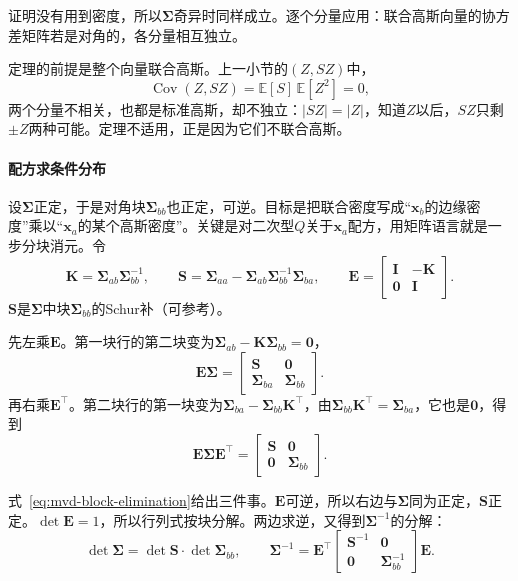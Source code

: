证明没有用到密度，所以$\bm{\Sigma}$奇异时同样成立。逐个分量应用：联合高斯向量的协方差矩阵若是对角的，各分量相互独立。

定理的前提是整个向量联合高斯。上一小节的$(Z,SZ)$中，
\[
 \operatorname{Cov}(Z,SZ)=\mathbb{E}[S]\,\mathbb{E}[Z^{2}]=0 ,
\]
两个分量不相关，也都是标准高斯，却不独立：$\lvert SZ\rvert=\lvert Z\rvert$，知道$Z$以后，$SZ$只剩$\pm Z$两种可能。定理不适用，正是因为它们不联合高斯。

\paragraph{配方求条件分布}
设$\bm{\Sigma}$正定，于是对角块$\bm{\Sigma}_{bb}$也正定，可逆。目标是把联合密度写成“$\bm{x}_b$的边缘密度”乘以“$\bm{x}_a$的某个高斯密度”。关键是对二次型$Q$关于$\bm{x}_a$配方，用矩阵语言就是一步分块消元。令
\[
 \bm{K}=\bm{\Sigma}_{ab}\bm{\Sigma}_{bb}^{-1},\qquad
 \bm{S}=\bm{\Sigma}_{aa}-\bm{\Sigma}_{ab}\bm{\Sigma}_{bb}^{-1}\bm{\Sigma}_{ba},\qquad
 \bm{E}=\begin{bmatrix}\bm{I}&-\bm{K}\\\bm{0}&\bm{I}\end{bmatrix} .
\]
$\bm{S}$是$\bm{\Sigma}$中块$\bm{\Sigma}_{bb}$的Schur补（可参考）。

先左乘$\bm{E}$。第一块行的第二块变为$\bm{\Sigma}_{ab}-\bm{K}\bm{\Sigma}_{bb}=\bm{0}$，
\[
 \bm{E}\bm{\Sigma}=\begin{bmatrix}\bm{S}&\bm{0}\\\bm{\Sigma}_{ba}&\bm{\Sigma}_{bb}\end{bmatrix} .
\]
再右乘$\bm{E}^{\top}$。第二块行的第一块变为$\bm{\Sigma}_{ba}-\bm{\Sigma}_{bb}\bm{K}^{\top}$，由$\bm{\Sigma}_{bb}\bm{K}^{\top}=\bm{\Sigma}_{ba}$，它也是$\bm{0}$，得到
\begin{equation}
 \bm{E}\bm{\Sigma}\bm{E}^{\top}=\begin{bmatrix}\bm{S}&\bm{0}\\\bm{0}&\bm{\Sigma}_{bb}\end{bmatrix} .
 \label{eq:mvd-block-elimination}
\end{equation}

式~\eqref{eq:mvd-block-elimination}给出三件事。$\bm{E}$可逆，所以右边与$\bm{\Sigma}$同为正定，$\bm{S}$正定。$\det\bm{E}=1$，所以行列式按块分解。两边求逆，又得到$\bm{\Sigma}^{-1}$的分解：
\[
 \det\bm{\Sigma}=\det\bm{S}\cdot\det\bm{\Sigma}_{bb},\qquad
 \bm{\Sigma}^{-1}=\bm{E}^{\top}\begin{bmatrix}\bm{S}^{-1}&\bm{0}\\\bm{0}&\bm{\Sigma}_{bb}^{-1}\end{bmatrix}\bm{E} .
\]


